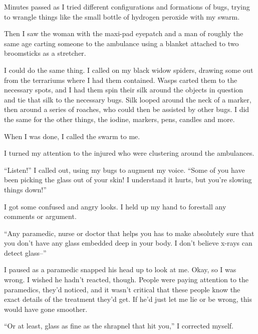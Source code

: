Minutes passed as I tried different configurations and formations of bugs, trying to wrangle things like the small bottle of hydrogen peroxide with my swarm.



Then I saw the woman with the maxi-pad eyepatch and a man of roughly the same age carting someone to the ambulance using a blanket attached to two broomsticks as a stretcher.



I could do the same thing.  I called on my black widow spiders, drawing some out from the terrariums where I had them contained.  Wasps carted them to the necessary spots, and I had them spin their silk around the objects in question and tie that silk to the necessary bugs.  Silk looped around the neck of a marker, then around a series of roaches, who could then be assisted by other bugs.  I did the same for the other things, the iodine, markers, pens, candles and more.



When I was done, I called the swarm to me.



I turned my attention to the injured who were clustering around the ambulances.



``Listen!'' I called out, using my bugs to augment my voice.  ``Some of you have been picking the glass out of your skin!  I understand it hurts, but you're slowing things down!''



I got some confused and angry looks.  I held up my hand to forestall any comments or argument.



``Any paramedic, nurse or doctor that helps you has to make absolutely sure that you don't have any glass embedded deep in your body.  I don't believe x-rays can detect glass--''



I paused as a paramedic snapped his head up to look at me.  Okay, so I was wrong.  I wished he hadn't reacted, though.  People were paying attention to the paramedics, they'd noticed, and it wasn't critical that these people know the exact details of the treatment they'd get.  If he'd just let me lie or be wrong, this would have gone smoother.



``Or at least, glass as fine as the shrapnel that hit you,'' I corrected myself.



